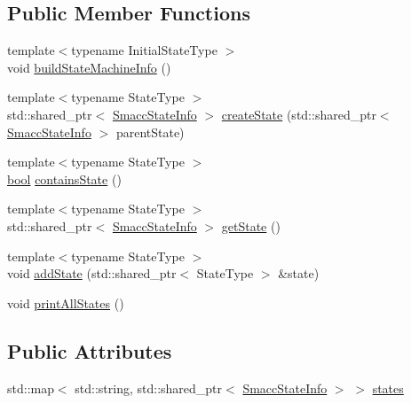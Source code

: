 \subsection*{Public Member Functions}
\begin{DoxyCompactItemize}
\item 
{\footnotesize template$<$typename Initial\+State\+Type $>$ }\\void \hyperlink{classsmacc_1_1SmaccStateMachineInfo_abef92b54a5e643232491db968de4aff0}{build\+State\+Machine\+Info} ()
\item 
{\footnotesize template$<$typename State\+Type $>$ }\\std\+::shared\+\_\+ptr$<$ \hyperlink{classsmacc_1_1SmaccStateInfo}{Smacc\+State\+Info} $>$ \hyperlink{classsmacc_1_1SmaccStateMachineInfo_a2d5759ccb5a8296debcc5dec741d3b42}{create\+State} (std\+::shared\+\_\+ptr$<$ \hyperlink{classsmacc_1_1SmaccStateInfo}{Smacc\+State\+Info} $>$ parent\+State)
\item 
{\footnotesize template$<$typename State\+Type $>$ }\\\hyperlink{classbool}{bool} \hyperlink{classsmacc_1_1SmaccStateMachineInfo_a416fe38639da791c2c77686988b545b0}{contains\+State} ()
\item 
{\footnotesize template$<$typename State\+Type $>$ }\\std\+::shared\+\_\+ptr$<$ \hyperlink{classsmacc_1_1SmaccStateInfo}{Smacc\+State\+Info} $>$ \hyperlink{classsmacc_1_1SmaccStateMachineInfo_a50cfbf5f500583054b98aaef7495bdb0}{get\+State} ()
\item 
{\footnotesize template$<$typename State\+Type $>$ }\\void \hyperlink{classsmacc_1_1SmaccStateMachineInfo_a188e81067d4a693ce479518dc87cf89b}{add\+State} (std\+::shared\+\_\+ptr$<$ State\+Type $>$ \&state)
\item 
void \hyperlink{classsmacc_1_1SmaccStateMachineInfo_a9f7848e013ff10b06f5a32cf81bd108f}{print\+All\+States} ()
\end{DoxyCompactItemize}
\subsection*{Public Attributes}
\begin{DoxyCompactItemize}
\item 
std\+::map$<$ std\+::string, std\+::shared\+\_\+ptr$<$ \hyperlink{classsmacc_1_1SmaccStateInfo}{Smacc\+State\+Info} $>$ $>$ \hyperlink{classsmacc_1_1SmaccStateMachineInfo_a8d6f1a9ce60f39835e7aa2179139977f}{states}
\end{DoxyCompactItemize}


